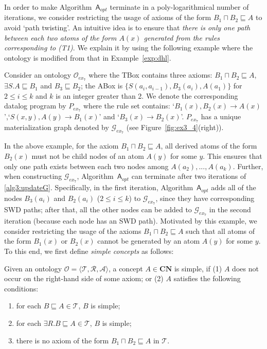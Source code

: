 In order to make Algorithm~$\mathsf{A}_{opt}$ terminate in a poly-logarithmical number of iterations,
we consider restricting the usage of axioms of the form $B_1\sqcap B_2\sqsubseteq A$
to avoid `path twisting'. An intuitive idea is to
ensure that \emph{there is only one path between each two atoms of the form $A(x)$
generated from the rules corresponding to (T1)}.
We explain it by using the following example where the ontology is modified from
that in Example~\ref{exp:dhl}.

\begin{example}\label{exp:simpleC}
Consider an ontology $\mathcal{O}_{ex_7}$ where the TBox contains three axioms:
$B_1\sqcap B_2\sqsubseteq A$, $\exists S.A\sqsubseteq B_1$ and $B_3\sqsubseteq B_2$;
the ABox is $\{S(a_i,a_{i-1}), B_3(a_i), A(a_1)\}$
for $2\leq i\leq k$ and $k$ is an integer greater than 2.
We denote the corresponding datalog program by $P_{ex_7}$ where the rule set contains:
`$B_1(x),B_2(x)\rightarrow A(x)$',`$S(x,y),A(y)\rightarrow B_1(x)$' and `$B_3(x)\rightarrow B_2(x)$'.
$P_{ex_7}$ has a unique materialization graph denoted by $\mathcal{G}_{ex_7}$ (see Figure~\ref{fig:ex3_4}(right)).
\end{example}

In the above example, for the axiom $B_1\sqcap B_2\sqsubseteq A$, all derived atoms
of the form $B_2(x)$ must not be child nodes of an atom $A(y)$ for some $y$.
This ensures that only one path exists between each two nodes among $A(a_2),...,A(a_k)$.
Further, when constructing $\mathcal{G}_{ex_7}$, Algorithm~$\mathsf{A}_{opt}$ can terminate after
two iterations of \ref{alg3:updateG}. Specifically, in the first iteration, Algorithm~$\mathsf{A}_{opt}$
adds all of the nodes $B_3(a_i)$ and $B_2(a_i)$ ($2\leq i\leq k$) to $\mathcal{G}_{ex_7}$,
since they have corresponding SWD paths;
after that, all the other nodes
can be added to $\mathcal{G}_{ex_7}$ in the second iteration (because each
node has an SWD path).
Motivated by this example, we consider restricting the usage of
the axioms $B_1\sqcap B_2\sqsubseteq A$
such that all atoms of the form $B_1(x)$ or $B_2(x)$ cannot be generated by an atom $A(y)$
for some $y$.
To this end, we first define \emph{simple concepts} as follows:

\begin{definition}
Given an ontology $\mathcal{O}=\langle\mathcal{T},\mathcal{R},\mathcal{A}\rangle$,
a concept $A\in\textbf{CN}$ is simple, if (1) $A$ does not occur on the right-hand side
of some axiom; or (2) $A$ satisfies the following conditions:
\begin{enumerate}[leftmargin=4ex,label=\arabic*.]
\item for each $B\sqsubseteq A\in\mathcal{T}$, $B$ is simple;
\item for each $\exists R.B\sqsubseteq A\in\mathcal{T}$, $B$ is simple;
\item there is no axiom of the form $B_1\sqcap B_2\sqsubseteq A$ in $\mathcal{T}$.
\end{enumerate}
\end{definition}

